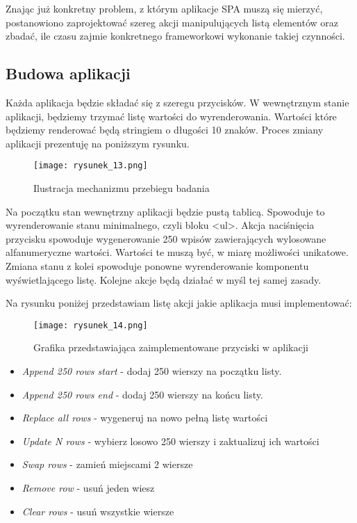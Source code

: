Znając już konkretny problem, z którym aplikacje SPA muszą się mierzyć, postanowiono zaprojektować szereg akcji manipulujących listą elementów oraz zbadać, ile czasu zajmie konkretnego frameworkowi wykonanie takiej czynności.

\subsection{Budowa aplikacji}

Każda aplikacja będzie składać się z szeregu przycisków. W wewnętrznym stanie aplikacji, będziemy trzymać listę wartości do wyrenderowania. Wartości które będziemy renderować będą stringiem o długości 10 znaków. Proces zmiany aplikacji prezentuję na poniższym rysunku.
\begin{figure}[!ht]
    \centering
    \texttt{[image: rysunek\_13.png]}
    \caption{Ilustracja mechanizmu przebiegu badania}
    \label{fig:rysunek_13}
\end{figure}

Na początku stan wewnętrzny aplikacji będzie pustą tablicą. Spowoduje to wyrenderowanie stanu minimalnego, czyli bloku <ul>.
Akcja naciśnięcia przycisku spowoduje wygenerowanie 250 wpisów zawierających wylosowane alfanumeryczne wartości. Wartości te muszą być, w miarę możliwości unikatowe.
Zmiana stanu z kolei spowoduje ponowne wyrenderowanie komponentu wyświetlającego listę. Kolejne akcje będą działać w myśl tej samej zasady.

Na rysunku poniżej przedstawiam listę akcji jakie aplikacja musi implementować:

\begin{figure}[!ht]
    \centering
    \texttt{[image: rysunek\_14.png]}
    \caption{Grafika przedstawiająca zaimplementowane przyciski w aplikacji}
    \label{fig:rysunek_14}
\end{figure}

\begin{itemize}
    \item \emph{Append 250 rows start} - dodaj 250 wierszy na początku listy.
    \item \emph{Append 250 rows end} - dodaj 250 wierszy na końcu listy.
    \item \emph{Replace all rows} - wygeneruj na nowo pełną listę wartości
    \item \emph{Update N rows} - wybierz losowo 250 wierszy i zaktualizuj ich wartości
    \item \emph{Swap rows} - zamień miejscami 2 wiersze
    \item \emph{Remove row} - usuń jeden wiesz
    \item \emph{Clear rows} - usuń wszystkie wiersze
\end{itemize}

